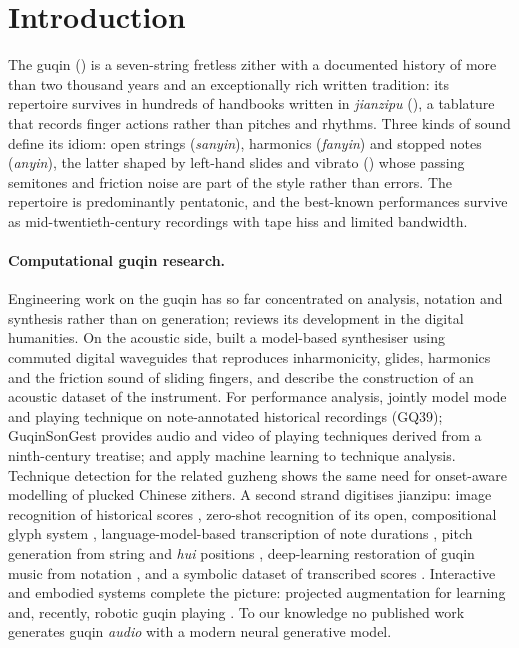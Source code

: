 \section{Introduction}\label{sec:intro}

The guqin () is a seven-string fretless zither with a documented history of more than two thousand
years and an exceptionally rich written tradition: its repertoire survives in hundreds of handbooks written in
\emph{jianzipu} (), a tablature that records finger actions rather than pitches and rhythms. Three kinds of
sound define its idiom: open strings (\emph{sanyin}), harmonics (\emph{fanyin}) and stopped notes (\emph{anyin}),
the latter shaped by left-hand slides and vibrato () whose passing semitones and friction noise are
part of the style rather than errors. The repertoire is predominantly pentatonic, and the best-known performances
survive as mid-twentieth-century recordings with tape hiss and limited bandwidth.

\paragraph{Computational guqin research.} Engineering work on the guqin has so far concentrated on analysis,
notation and synthesis rather than on generation; \cite{hui2024retrospective} reviews its development in the
digital humanities. On the acoustic side, \cite{penttinen2006guqin} built a model-based synthesiser using
commuted digital waveguides that reproduces inharmonicity, glides, harmonics and the friction sound of sliding
fingers, and \cite{liu2024dataset} describe the construction of an acoustic dataset of the instrument. For
performance analysis, \cite{huang2020guqin} jointly model mode and playing technique on note-annotated historical
recordings (GQ39); GuqinSonGest \citep{han2025guqinsongest} provides audio and video of playing techniques derived
from a ninth-century treatise; and \cite{zhang2025techniques} apply machine learning to technique analysis.
Technique detection for the related guzheng \citep{li2022guzheng} shows the same need for onset-aware modelling of
plucked Chinese zithers. A second strand digitises jianzipu: image recognition of historical scores
\citep{chen2025jianzipu}, zero-shot recognition of its open, compositional glyph system \citep{li2026jianzi},
language-model-based transcription of note durations \citep{shi2024qinbert}, pitch generation from string and
\emph{hui} positions \citep{wang2025jianzipu}, deep-learning restoration of guqin music from notation
\citep{kuremoto2024restoration}, and a symbolic dataset of transcribed scores \citep{guqindataset}. Interactive and
embodied systems complete the picture: projected augmentation for learning \citep{zhang2015chinar} and, recently,
robotic guqin playing \citep{zhang2026hapticfinger,wang2026robotguqin}. To our knowledge no published work generates
guqin \emph{audio} with a modern neural generative model.

